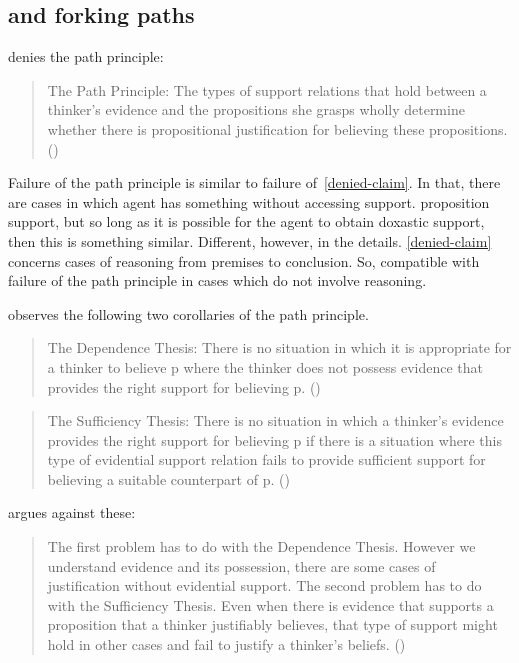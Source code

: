 \subsection{\citeauthor{Littlejohn:2018uq} and forking paths}
\label{sec:littlejohn}

\textcite{Littlejohn:2018uq} denies the path principle:

\begin{quote}
  The Path Principle: The types of support relations that hold between a thinker's evidence and the propositions she grasps wholly determine whether there is propositional justification for believing these propositions.\nolinebreak
  \mbox{}\hfill\mbox{(\citeyear[224]{Littlejohn:2018uq})}
\end{quote}

Failure of the path principle is similar to failure of~\ref{denied-claim}.
In that, there are cases in which agent has something without accessing support.
proposition support, but so long as it is possible for the agent to obtain doxastic support, then this is something similar.
Different, however, in the details.
\ref{denied-claim} concerns cases of reasoning from premises to conclusion.
So, compatible with failure of the path principle in cases which do not involve reasoning.

\citeauthor{Littlejohn:2018uq} observes the following two corollaries of the path principle.

\begin{quote}
  The Dependence Thesis: There is no situation in which it is appropriate for a thinker to believe p where the thinker does not possess evidence that provides the right support for believing p.\nolinebreak
  \mbox{}\hfill\mbox{(\citeyear[227]{Littlejohn:2018uq})}
\end{quote}

\begin{quote}
  The Sufficiency Thesis: There is no situation in which a thinker's evidence provides the right support for believing p if there is a situation where this type of evidential support relation fails to provide sufficient support for believing a suitable counterpart of p.\nolinebreak
  \mbox{}\hfill\mbox{(\citeyear[227]{Littlejohn:2018uq})}
\end{quote}

\citeauthor{Littlejohn:2018uq} argues against these:

\begin{quote}
  The first problem has to do with the Dependence Thesis.
  However we understand evidence and its possession, there are some cases of justification without evidential support.
  The second problem has to do with the Sufficiency Thesis.
  Even when there is evidence that supports a proposition that a thinker justifiably believes, that type of support might hold in other cases and fail to justify a thinker's beliefs.\nolinebreak
  \mbox{}\hfill\mbox{(\citeyear[227]{Littlejohn:2018uq})}
\end{quote}

